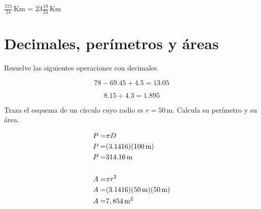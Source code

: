 \documentclass[11pt]{article}
\begin{document}
\vspace{1cm}

\hfill $\displaystyle\frac{575}{24}$\,Km = $23\displaystyle\frac{19}{24}$\,Km \hfill \ 

\newpage

\section{Decimales, per\'imetros y \'areas }

Resuelve las siguientes operaciones con decimales.

\begin{multicols}{2}

\begin{equation*}
    78 - 69.45 + 4.5= 13.05
\end{equation*}

\begin{equation*}
    8.15 \div 4.3 = 1.895
\end{equation*}

\end{multicols}

\vspace{3cm}

Traza el esquema de un c\'irculo cuyo radio es $r=50$\,m. Calcula su per\'imetro y su \'area.

\vspace{5mm}

\begin{minipage}{0.5\linewidth}
\end{minipage}%
\begin{minipage}{0.5\linewidth}
\begin{align*}
P =& \pi D \\
P =& (3.1416)(100 \text{\,m}) \\
P =& 314.16 \text{\,m} \\ \\
A =& \pi r^{2} \\
A =& (3.1416)(50\text{\,m})(50\text{\,m}) \\
A =& 7,854\text{\,m}^{2} 
\end{align*}
\end{minipage}

\vspace{5mm}
\end{document}
